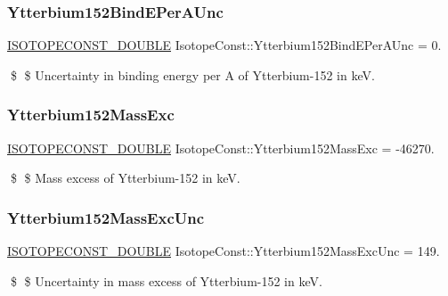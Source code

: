 \subsubsection{\texorpdfstring{Ytterbium152\+Bind\+E\+Per\+A\+Unc}{Ytterbium152BindEPerAUnc}}
{\footnotesize\ttfamily \mbox{\hyperlink{group___isotope_const-_macros_ga8f45a7272ce02c0b4c65c44636ed719a}{I\+S\+O\+T\+O\+P\+E\+C\+O\+N\+S\+T\+\_\+\+D\+O\+U\+B\+LE}} Isotope\+Const\+::\+Ytterbium152\+Bind\+E\+Per\+A\+Unc = 0.}

\$ \$ Uncertainty in binding energy per A of Ytterbium-\/152 in keV. \mbox{\label{group___isotope_const-_ytterbium-_yb152_gaa41b52d96f36cbcc73929e8823930254}} 
\subsubsection{\texorpdfstring{Ytterbium152\+Mass\+Exc}{Ytterbium152MassExc}}
{\footnotesize\ttfamily \mbox{\hyperlink{group___isotope_const-_macros_ga8f45a7272ce02c0b4c65c44636ed719a}{I\+S\+O\+T\+O\+P\+E\+C\+O\+N\+S\+T\+\_\+\+D\+O\+U\+B\+LE}} Isotope\+Const\+::\+Ytterbium152\+Mass\+Exc = -\/46270.}

\$ \$ Mass excess of Ytterbium-\/152 in keV. \mbox{\label{group___isotope_const-_ytterbium-_yb152_ga9b42a56785b55199fb859109158c6a6f}} 
\subsubsection{\texorpdfstring{Ytterbium152\+Mass\+Exc\+Unc}{Ytterbium152MassExcUnc}}
{\footnotesize\ttfamily \mbox{\hyperlink{group___isotope_const-_macros_ga8f45a7272ce02c0b4c65c44636ed719a}{I\+S\+O\+T\+O\+P\+E\+C\+O\+N\+S\+T\+\_\+\+D\+O\+U\+B\+LE}} Isotope\+Const\+::\+Ytterbium152\+Mass\+Exc\+Unc = 149.}

\$ \$ Uncertainty in mass excess of Ytterbium-\/152 in keV. \mbox{\label{group___isotope_const-_ytterbium-_yb152_gabd8fec44f3800b2ad92ed0d06b61a1d4}} 
